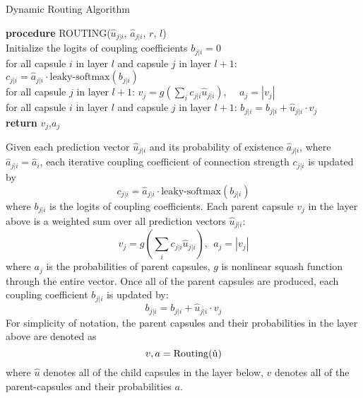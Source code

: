 \documentclass[11pt]{article}
\begin{document}
\begin{algorithm}
  \label{alg:1}
  \caption{Dynamic Routing Algorithm}
  \textbf{procedure} ROUTING(\textbf{$\hat{u}_{j|i}$}, $\hat{a}_{j|i}$, $r$, $l$)\\
        Initialize the logits of coupling coefficients $b_{j|i}=0$ \\
	{
for all capsule $i$ in layer $l$ and capsule $j$ in layer $l+1$: 
$c_{j|i}=\hat{a}_{j|i} \cdot \text{leaky-softmax}(b_{j|i})$\\
	    for all capsule $j$ in layer $l+1$: $v_{j}=g(\sum_{i}c_{j|i}\hat{u}_{j|i})$, \ \ $a_{j}=|v_{j}|$\\
	    for all capsule $i$ in layer $l$ and capsule $j$ in layer $l+1$: $b_{j|i}=b_{j|i}+\hat{u}_{j|i} \cdot v_{j}$\\
	}
  \textbf{return} $v_{j}$,$a_{j}$\\
\end{algorithm}



Given each prediction vector $\hat{u}_{j|i}$ and its probability of existence $\hat{a}_{j|i}$, where $\hat{a}_{j|i}=\hat{a}_{i}$, each iterative coupling coefficient of connection strength $c_{j|i}$ is updated by
\begin{equation}
\label{eq:2}
c_{j|i}=\hat{a}_{j|i} \cdot \text{leaky-softmax}(b_{j|i})
\end{equation}
where $b_{j|i}$ is the logits of coupling coefficients. Each parent capsule $v_{j}$ in the layer above is a weighted sum over all prediction vectors $\hat{u}_{j|i}$:
\begin{equation}
v_{j}=g(\sum_{i}c_{j|i}\hat{u}_{j|i}),\ \ a_{j}=|v_{j}|
\end{equation}
where $a_{j}$ is the probabilities of parent capsules, $g$ is nonlinear squash function  through the entire vector.  Once all of the parent capsules are produced, each coupling coefficient $b_{j|i}$ is updated by:
\begin{equation}
b_{j|i}=b_{j|i}+\hat{u}_{j|i} \cdot v_{j}
\end{equation}
For simplicity of notation, the parent capsules and their probabilities in the layer above are denoted as
\begin{equation}
v, a=\rm{Routing}(\hat{u})
\end{equation}
where $\hat{u}$ denotes all of the child capsules in the layer below, $v$ denotes all of the parent-capsules and their probabilities $a$.
\end{document}
